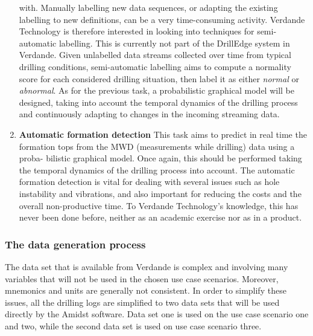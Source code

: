 \documentclass{article}
\theoremstyle{theorem}
\theoremstyle{definition}
\begin{document}
\begin{enumerate}
with. Manually labelling new data sequences, or adapting the existing labelling to
new definitions, can be a very time-consuming activity. Verdande Technology is
therefore interested in looking into techniques for semi-automatic labelling. This
is currently not part of the DrillEdge system in Verdande.
Given unlabelled data streams collected over time from typical drilling conditions,
semi-automatic labelling aims to compute a normality score for each considered
drilling situation, then label it as either \emph{normal} or \emph{abnormal}. As for the
previous task, a probabilistic graphical model will be designed, taking into account
the temporal dynamics of the drilling process and continuously adapting to changes
in the incoming streaming data.
\item {\bf Automatic formation detection}
This task aims to predict in real time the formation tops from the MWD (measurements while drilling) data using a proba-
bilistic graphical model. Once again, this should be performed taking the temporal
dynamics of the drilling process into account. The automatic formation detection
is vital for dealing with several issues such as hole instability and vibrations, and
also important for reducing the costs and the overall non-productive time. To
Verdande Technology's knowledge, this has never been done before, neither as an
academic exercise nor as in a product.
\end{enumerate}





\subsubsection{The data generation process}

The data set that is available from Verdande is complex and involving many variables that will not be used in the chosen use case scenarios.  Moreover, mnemonics and units are generally not consistent.  In order to simplify these issues, all the drilling logs are simplified to two data sets that will be used directly by the Amidst software.  Data set one is used on the use case scenario one and two, while the second data set is used on use case scenario three.
\end{document}
